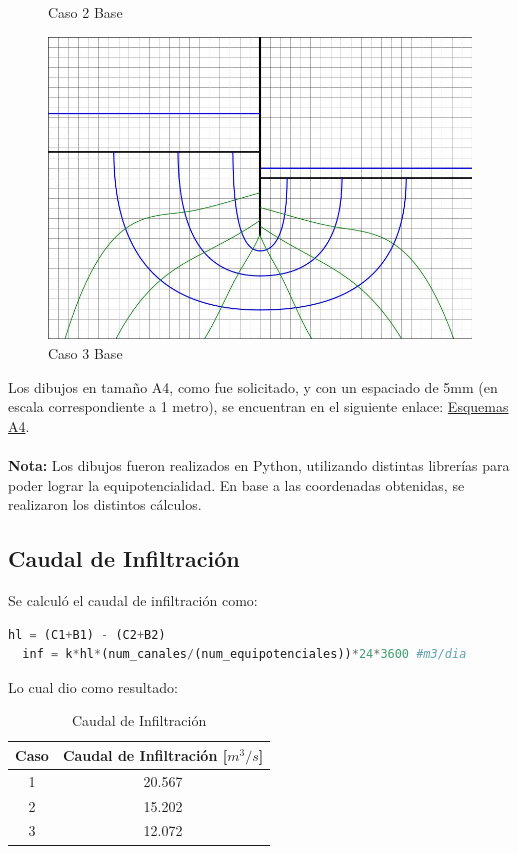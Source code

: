 \begin{figure}[H]
\begin{minipage}{0.32\textwidth}
      \caption{Caso 2 Base}
  \end{minipage}
  \begin{minipage}{0.32\textwidth}
      \centering
      \includegraphics[width=\textwidth]{FOTOS/caso_3dibujo_base.jpg}
      \caption{Caso 3 Base}
  \end{minipage}
\end{figure}

Los dibujos en tamaño A4, como fue solicitado, y con un espaciado de 5mm (en escala correspondiente a 1 metro), se encuentran en el siguiente enlace: \href{https://github.com/LukasWolff2002/PROYECTO_1_MCOC/tree/main/DIBUJOS_A4}{Esquemas A4}.
\\ \\
\textbf{Nota:} Los dibujos fueron realizados en Python, utilizando distintas librerías para poder lograr la equipotencialidad. En base a las coordenadas obtenidas, se realizaron los distintos cálculos.

\subsection{Caudal de Infiltración}

Se calculó el caudal de infiltración como:

\begin{lstlisting}[language=Python]
  hl = (C1+B1) - (C2+B2)
  inf = k*hl*(num_canales/(num_equipotenciales))*24*3600 #m3/dia
\end{lstlisting}

Lo cual dio como resultado:

\begin{table}[H]
  \centering
  \begin{tabular}{|c|c|}
    \hline
    Caso & Caudal de Infiltración [$m^3/s$] \\
    \hline
    1 & 20.567 \\ \hline
    2 & 15.202 \\ \hline
    3 & 12.072 \\
    \hline
  \end{tabular}
  \caption{Caudal de Infiltración}
\end{table}

